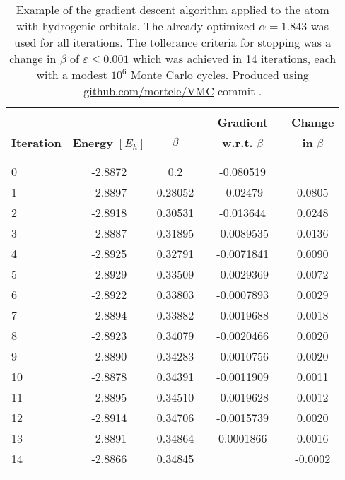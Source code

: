 \documentclass[../../master.tex]{subfiles}
\begin{document}
\begin{table}
\centering{}
\setlength\extrarowheight{2pt}
\begin{tabularx}{\textwidth}{X *{6}{S[table-format=-1.3,table-space-text-post=***]}}
\hline
\hline
\\[-0.9em]
                   &                          &          &  & \textbf{Gradient}        & & \textbf{Change}\\
\textbf{Iteration} & \textbf{Energy} $[E_h]$  &  $\beta$ &  & \textbf{w.r.t. } $\beta$ & & \textbf{in } $\beta$\\
\\[-0.9em]
\hline
\\[-0.9em]
     0   &   -2.8872   &       0.2 & & -0.080519  &  &         \\
     1   &   -2.8897   &   0.28052 & & -0.02479  &   & 0.0805 \\
     2   &   -2.8918   &   0.30531 & & -0.013644  &  &  0.0248 \\
     3   &   -2.8887   &   0.31895 & & -0.0089535  & &   0.0136 \\
     4   &   -2.8925   &   0.32791 & & -0.0071841  & &   0.0090 \\
     5   &   -2.8929   &   0.33509 & & -0.0029369  & &   0.0072 \\
     6   &   -2.8922   &   0.33803 & & -0.0007893  & &   0.0029 \\
     7   &   -2.8894   &   0.33882 & & -0.0019688  & &   0.0018 \\
     8   &   -2.8923   &   0.34079 & & -0.0020466  & &   0.0020 \\
     9   &   -2.8890   &   0.34283 & & -0.0010756  & &   0.0020 \\
    10   &   -2.8878   &   0.34391 & & -0.0011909  & &   0.0011 \\
    11   &   -2.8895   &   0.34510 & & -0.0019628  & &   0.0012 \\
    12   &   -2.8914   &   0.34706 & & -0.0015739  & &   0.0020 \\
    13   &   -2.8891   &   0.34864 & &  0.0001866  & &   0.0016 \\ 
    14   &   -2.8866   &   0.34845 & &   & &  -0.0002 \\
    \\[-0.9em]
\hline
\end{tabularx}
\caption{Example of the gradient descent algorithm applied to the  atom with hydrogenic orbitals. The already optimized $\alpha=1.843$ was used for all iterations. The tollerance criteria for stopping was a change in $\beta$ of $\varepsilon\le0.001$ which was achieved in 14 iterations, each with a modest $10^6$ Monte Carlo cycles. Produced using \url{github.com/mortele/VMC} commit . \label{tab:gradd}}
\end{table}
\end{document}
